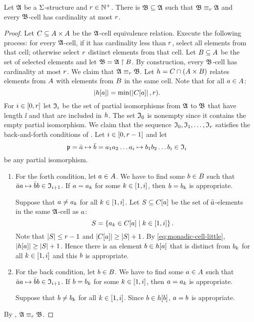 \begin{lemma}\label{lem:monadic-cell}
Let $\mathfrak{A}$ be a $\mathrm{\Sigma}$-structure and $r \in \mathbb{N}^{+}$.
There is $\mathfrak{B} \subseteq \mathfrak{A}$ such that
$\mathfrak{B} \equiv_{r} \mathfrak{A}$ and every $\mathfrak{B}$-cell has cardinality at most $r$.
\end{lemma}
\begin{proof}
Let $C \subseteq {A\times A}$ be the $\mathfrak{A}$-cell equivalence relation.
Execute the following process: for every $\mathfrak{A}$-cell, if it has cardinality
less than $r$, select all elements from that cell;
otherwise select $r$ distinct elements from that cell.
Let $B \subseteq A$ be the set of selected elements and let
$\mathfrak{B} = \mathfrak{A} \restriction B$.
By construction, every $\mathfrak{B}$-cell has cardinality at most $r$.
We claim that $\mathfrak{A} \equiv_{r} \mathfrak{B}$.
Let $h = C \cap (A \times B)$ relates elements from $A$ with
elements from $B$ in the same cell.
Note that for all $a \in A$:
\begin{equation}\label{eq:monadic-cell-little}
  \left|h[a]\right| = \min(\left|C[a]\right|, r).
\end{equation}
For $i\in[0,r]$ let $\mathfrak{I}_{i}$ be the set of partial isomorphisms from
$\mathfrak{A}$ to $\mathfrak{B}$ that have length $\ii$ and that are included in $h$.
The set $\mathfrak{I}_{0}$ is nonempty since it contains the empty partial isomorphism.
We claim that the sequence $\mathfrak{I}_{0}, \mathfrak{I}_{1}, \dots, \mathfrak{I}_{r}$
satisfies the back-and-forth conditions of .
Let $i \in [0,r-1]$ and let 
\[
  \mathfrak{p} = \bar{a} \mapsto \bar{b} =
  a_{1}a_{2}\dots a_{i} \mapsto b_{1}b_{2}\dots b_{i}
  \in
  \mathfrak{I}_{i}
\]
be any partial isomorphism.
\begin{enumerate}
  \item For the forth condition, let $a \in A$.
  We have to find some $b \in B$ such that
  $\bar{a}a \mapsto \bar{b}b \in \mathfrak{I}_{i+1}$.
  If $a = a_{k}$ for some $k \in [1,i]$, then $b = b_{k}$ is
  appropriate.
  
  Suppose that $a \neq a_{k}$ for all $k \in [1,i]$.
  Let $S \subseteq C[a]$ be the set of $\bar{a}$-elements in the same
  $\mathfrak{A}$-cell as $a$:
  \[
    S = \left\{a_{k} \in C[a]\mathrel{}\middle|\mathrel{}k \in [1,i]\right\}.
  \]
  Note that $\left|S\right| \leq r-1$ and
  $\left|C[a]\right| \geq \left|S\right| + 1$.
  By \cref{eq:monadic-cell-little}, $\left|h[a]\right| \geq \left|S\right| + 1$.
  Hence there is an element $b \in h[a]$ that is distinct from
  $b_{k}$ for all $k \in [1,i]$ and this $b$ is appropriate.

  \item For the back condition, let $b \in B$.
  We have to find some $a \in A$ such that
  $\bar{a}a \mapsto \bar{b}b \in \mathfrak{I}_{i+1}$.
  If $b = b_{k}$ for some $k \in [1,i]$, then $a = a_{k}$ is
  appropriate.
  
  Suppose that $b \neq b_{k}$ for all $k \in [1,i]$. Since $b \in
  h[b]$, $a = b$ is appropriate.
\end{enumerate}
By , $\mathfrak{A} \equiv_{r} \mathfrak{B}$.
\end{proof}